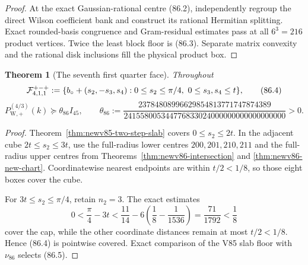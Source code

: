 \documentclass[11pt,oneside]{article}
\newtheorem{theorem}{Theorem}[section]
\theoremstyle{definition}
\theoremstyle{remark}
\begin{document}
\begin{proof}
At the exact Gaussian-rational centre (86.2), independently regroup
the direct Wilson coefficient bank and construct its rational
Hermitian splitting.  Exact rounded-basis congruence and
Gram-residual estimates pass at all \(6^3=216\) product vertices.
Twice the least block floor is (86.3).  Separate matrix convexity
and the rational disk inclusions fill the physical product box.
\end{proof}

\begin{theorem}[The seventh first quarter face]
\label{thm:newv86-first-face}
Throughout
\[
 {\cal F}^{+-+}_{4,1,1}:=
 \{b_\circ+(s_2,-s_3,s_4):
 0\leq s_2\leq\pi/4,\ 0\leq s_3,s_4\leq t\},          \tag{86.4}
\]
\[
 P_{\mathrm W,+}^{(4/3)}(k)
 \succeq\theta_{86}I_{45},\qquad
 \theta_{86}:=
 \frac{23784808996629854813771747874389}
 {241558005344776833024000000000000000000}>0.         \tag{86.5}
\]
\end{theorem}

\begin{proof}
Theorem~\ref{thm:newv85-two-step-slab} covers
\(0\leq s_2\leq2t\).  In the adjacent cube
\(2t\leq s_2\leq3t\), use the full-radius lower centres
\(200,201,210,211\) and the full-radius upper centres from
Theorems~\ref{thm:newv86-intersection} and
\ref{thm:newv86-new-chart}.  Coordinatewise nearest endpoints are
within \(t/2<1/8\), so those eight boxes cover the cube.

For \(3t\leq s_2\leq\pi/4\), retain \(n_2=3\).  The exact estimates
\[
 0<\frac{\pi}{4}-3t
 <\frac{11}{14}-6\left(\frac18-\frac1{1536}\right)
 =\frac{71}{1792}<\frac18                             \tag{86.6}
\]
cover the cap, while the other coordinate distances remain at most
\(t/2<1/8\).  Hence (86.4) is pointwise covered.  Exact comparison
of the V85 slab floor with \(\nu_{86}\) selects (86.5).
\end{proof}
\end{document}

